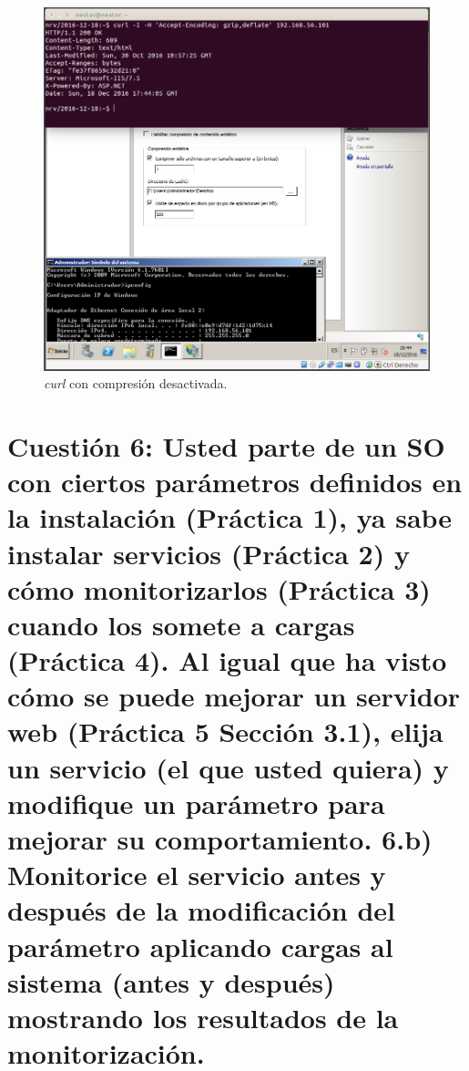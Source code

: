 \documentclass[a4paper,titlepage,12pt]{scrartcl}	%
\numberwithin{figure}{section} %
\numberwithin{table}{section} %
\begin{document}
	\begin{figure}[H]
		\centering
		\includegraphics[scale=0.33]{./Imagenes/5-5.png}
		\caption[\textit{curl} con compresión desactivada.]{\textit{curl} con compresión desactivada.}
		\label{5-5}
	\end{figure}
	
	\section[Cuestión 6: Usted parte de un SO con ciertos parámetros definidos en la instalación (Práctica 1), ya sabe instalar servicios (Práctica 2) y cómo monitorizarlos (Práctica 3) cuando los somete a cargas (Práctica 4). Al igual que ha visto cómo se puede mejorar un servidor web (Práctica 5 Sección 3.1), elija un servicio (el que usted quiera) y modifique un parámetro para mejorar su comportamiento. \textbf{6.b)} Monitorice el servicio antes y después de la modificación del parámetro aplicando cargas al sistema (antes y después) mostrando los resultados de la monitorización.]{Cuestión 6: Usted parte de un SO con ciertos parámetros definidos en la instalación (Práctica 1), ya sabe instalar servicios (Práctica 2) y cómo monitorizarlos (Práctica 3) cuando los somete a cargas (Práctica 4). Al igual que ha visto cómo se puede mejorar un servidor web (Práctica 5 Sección 3.1), elija un servicio (el que usted quiera) y modifique un parámetro para mejorar su comportamiento. \textbf{6.b)} Monitorice el servicio antes y después de la modificación del parámetro aplicando cargas al sistema (antes y después) mostrando los resultados de la monitorización.}
	
\end{document}
